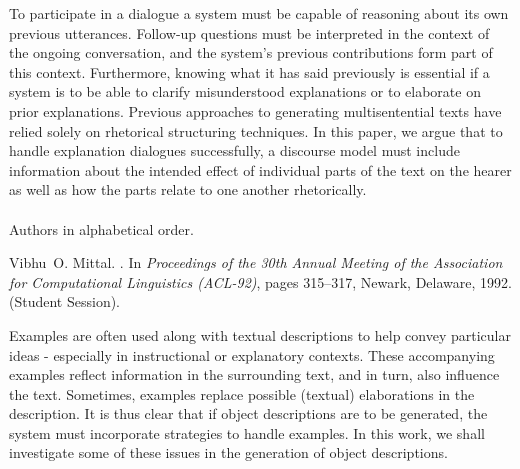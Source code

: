 \begin{thebibliography}{10}
{\leftskip=0.1in\rightskip=0.1in\begin{small}\par{}To
  participate in a dialogue a system must be capable of reasoning about its own
  previous utterances. Follow-up questions must be interpreted in the context
  of the ongoing conversation, and the system's previous contributions form
  part of this context. Furthermore, knowing what it has said previously is
  essential if a system is to be able to clarify misunderstood explanations or
  to elaborate on prior explanations. Previous approaches to generating
  multisentential texts have relied solely on rhetorical structuring
  techniques. In this paper, we argue that to handle explanation dialogues
  successfully, a discourse model must include information about the intended
  effect of individual parts of the text on the hearer as well as how the parts
  relate to one another rhetorically.\\ \\ Authors in alphabetical
  order.\end{small}\par}
\noindent\hspace*{\itemindent}{\leftskip=0.1in\rightskip=0.1in\hrulefill}

Vibhu~O. Mittal.
.
\newblock In {\em Proceedings of the 30th Annual Meeting of the Association for
  Computational Linguistics (ACL-92)}, pages 315--317, Newark, Delaware, 1992.
\newblock (Student Session).

{\leftskip=0.1in\rightskip=0.1in\begin{small}\par{}Examples are often used along with textual descriptions to help convey
  particular ideas - especially in instructional or explanatory contexts. These
  accompanying examples reflect information in the surrounding text, and in
  turn, also influence the text. Sometimes, examples replace possible (textual)
  elaborations in the description. It is thus clear that if object descriptions
  are to be generated, the system must incorporate strategies to handle
  examples. In this work, we shall investigate some of these issues in the
  generation of object descriptions.\end{small}\par}
\noindent\hspace*{\itemindent}{\leftskip=0.1in\rightskip=0.1in\hrulefill}


\end{thebibliography}
